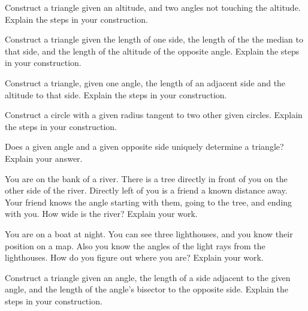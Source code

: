 \documentclass[nooutcomes]{ximera}
\begin{document}

\begin{problem}
Construct a triangle given an altitude, and two angles not
  touching the altitude. Explain the steps in your construction.
\end{problem}

\begin{problem}
Construct a triangle given the length of one side, the length of
  the the median to that side, and the length of the altitude of the
  opposite angle. Explain the steps in your construction.
\end{problem}

\begin{problem}
Construct a triangle, given one angle, the length of an adjacent
  side and the altitude to that side. Explain the steps in your
  construction.
\end{problem}

\begin{problem}
Construct a circle with a given radius tangent to two other
  given circles. Explain the steps in your construction.
\end{problem}

\begin{problem}
Does a given angle and a given opposite side uniquely determine
  a triangle? Explain your answer.
\end{problem}

\begin{problem}
You are on the bank of a river. There is a tree directly in
  front of you on the other side of the river. Directly left of you is
  a friend a known distance away. Your friend knows the angle starting
  with them, going to the tree, and ending with you. How wide is the
  river? Explain your work.
\end{problem}

\begin{problem}
You are on a boat at night. You can see three lighthouses, and
  you know their position on a map.  Also you know the angles of the
  light rays from the lighthouses.  How do you figure out where you
  are? Explain your work.
\end{problem}

\begin{problem}
Construct a triangle given an angle, the length of a side
  adjacent to the given angle, and the length of the angle's bisector
  to the opposite side. Explain the steps in your construction.
\end{problem}
\end{document}
